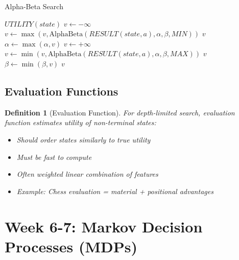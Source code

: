 \documentclass[11pt,letterpaper]{article}
\newtheorem{definition}{Definition}[section]
\begin{document}
\begin{algorithm}
\caption{Alpha-Beta Search}
\begin{algorithmic}[1]
        \State \Return $UTILITY(state)$
    \EndIf
        \State $v \gets -\infty$
            \State $v \gets \max(v, \text{AlphaBeta}(RESULT(state, a), \alpha, \beta, MIN))$
                \State \Return $v$ 
            \EndIf
            \State $\alpha \gets \max(\alpha, v)$
        \EndFor
    \Else
        \State $v \gets +\infty$
            \State $v \gets \min(v, \text{AlphaBeta}(RESULT(state, a), \alpha, \beta, MAX))$
                \State \Return $v$ 
            \EndIf
            \State $\beta \gets \min(\beta, v)$
        \EndFor
    \EndIf
    \State \Return $v$
\EndFunction
\end{algorithmic}
\end{algorithm}

\subsection{Evaluation Functions}

\begin{definition}[Evaluation Function]
For depth-limited search, evaluation function estimates utility of non-terminal states:
\begin{itemize}
    \item Should order states similarly to true utility
    \item Must be fast to compute
    \item Often weighted linear combination of features
    \item Example: Chess evaluation = material + positional advantages
\end{itemize}
\end{definition}

\section{Week 6-7: Markov Decision Processes (MDPs)}
\end{document}

